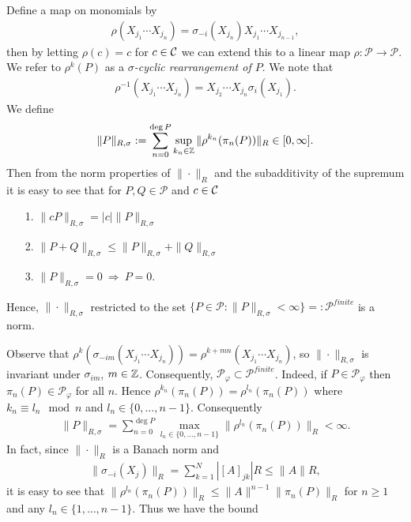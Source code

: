 	
Define a map on monomials by
	\begin{align*}
		\rho(X_{j_1}\cdots X_{j_n})=\sigma_{-i}(X_{j_n})X_{j_1}\cdots X_{j_{n-1}},
	\end{align*}
then by letting $\rho(c)=c$ for $c\in\mathcal C$ we can extend this to a linear map $\rho\colon\mathscr{P}\rightarrow\mathscr{P}$. We refer to $\rho^k(P)$ as a \textit{$\sigma$-cyclic rearrangement of $P$}. We note that
	\begin{align*}
		\rho^{-1}(X_{j_1}\cdots X_{j_n})=X_{j_2}\cdots X_{j_n}\sigma_i(X_{j_1}).
	\end{align*}
We define
	\begin{align*}
		\|P\|_{R,\sigma}:=\sum_{n=0}^{\deg{P}} \sup_{k_n\in\mathbb{Z}} \|\rho^{k_n}(\pi_n(P))\|_R \in [0,\infty].
	\end{align*}
Then from the norm properties of $\|\cdot\|_R$ and the subadditivity of the supremum it is easy to see that for $P,Q\in\mathscr{P}$ and $c\in\mathcal C$
	\begin{enumerate}
			\item[1.] $\| cP\|_{R,\sigma}=|c| \|P\|_{R,\sigma}$
			
			\item[2.] $\|P+Q\|_{R,\sigma}\leq \|P\|_{R,\sigma}+\|Q\|_{R,\sigma}$
			
			\item[3.] $\|P\|_{R,\sigma}=0\ \Longrightarrow\ P=0$.
	\end{enumerate}
Hence, $\|\cdot\|_{R,\sigma}$ restricted to the set $\{P\in\mathscr{P}\colon \|P\|_{R,\sigma}<\infty\}=:\mathscr{P}^{finite}$ is a norm.\par
Observe that $\rho^k(\sigma_{-im}(X_{j_1}\cdots X_{j_n}))=\rho^{k+mn}(X_{j_1}\cdots X_{j_n})$, so $\|\cdot\|_{R,\sigma}$ is invariant under $\sigma_{im}$, $m\in\mathbb{Z}$. Consequently, $\mathscr{P}_\varphi\subset \mathscr{P}^{finite}$. Indeed, if $P\in\mathscr{P}_\varphi$ then $\pi_n(P)\in\mathscr{P}_\varphi$ for all $n$. Hence $\rho^{k_n}(\pi_n(P))=\rho^{l_n}(\pi_n(P))$ where $k_n\equiv l_n\mod{n}$ and $l_n\in\{0,\ldots,n-1\}$. Consequently
	\begin{align*}
		\|P\|_{R,\sigma} =\sum_{n=0}^{\deg{P}} \max_{l_n\in\{0,\ldots,n-1\}} \|\rho^{l_n}(\pi_n(P))\|_R <\infty.
	\end{align*}
In fact, since $\|\cdot\|_R$ is a Banach norm and 
	\begin{align*}
		\|\sigma_{-i}(X_j)\|_R=\sum_{k=1}^N |[A]_{jk}| R\leq \|A\| R,
	\end{align*}
it is easy to see that $\|\rho^{l_n}(\pi_n(P))\|_R\leq \|A\|^{n-1} \|\pi_n(P)\|_R$ for $n\geq 1$ and any $l_n\in\{1,\ldots,n-1\}$. Thus we have the bound
